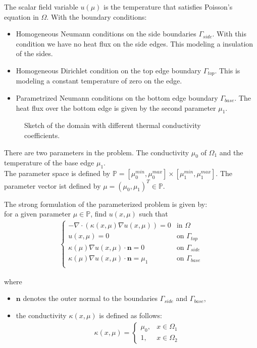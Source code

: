 The scalar field variable $u(\mu)$ is the temperature that satisfies Poisson’s equation in $\Omega$.
With the boundary conditions:
\begin{itemize}
	\item Homogeneous Neumann conditions on the side boundaries $\Gamma_{side}$. With this condition we have no heat  flux on the side edges.
	This modeling a insulation of the sides.
	\item Homogeneous Dirichlet condition on the top edge boundary $\Gamma_{top}$. This is modeling a constant temperature of zero on the edge.
	\item Parametrized Neumann conditions on the bottom edge boundary $\Gamma_{base}$. The heat flux over the bottom edge is given by the second parameter $\mu_1$.
\end{itemize}

\begin{figure}[H]
	\centering
	\scalebox{0.8}{
	
	}
	\caption[Sketch domain]{Sketch of the domain with different thermal conductivity coefficients.}
	\label{fig:scetchHeat}
\end{figure}

There are two parameters in the problem. The conductivity $\mu_0$ of $\Omega_1$ and the temperature of the base edge $\mu_1$.\\
The parameter space is defined by $\mathbb{P} = [\mu_{0}^{min},\mu_{0}^{max}] \times [\mu_{1}^{min},\mu_{1}^{max}]$. The parameter vector ist defined by $\mu = (\mu_0, \mu_1)^T \in \mathbb{P}$.

The strong formulation of the para\-meterized problem is given by:\\
for a given parameter $\mu \in \mathbb{P}$, find $u(x,\mu)$ such that
\begin{align}
\begin{cases}
- \nabla \cdot (\kappa(x,\mu)\nabla u(x,\mu)) = 0 	& \text{in } \Omega 		\\
u(x,\mu) = 0 										& \text{on } \Gamma_{top} 	\\
\kappa(\mu)\nabla u(x,\mu)\cdot \mathbf{n} = 0 		& \text{on } \Gamma_{side} 	\\
\kappa(\mu)\nabla u(x,\mu)\cdot \mathbf{n} = \mu_1 	& \text{on } \Gamma_{base} 	\\
\end{cases}
\end{align}


where 
\begin{itemize}
	\item $\mathbf{n}$ denotes the outer normal to the boundaries $\Gamma_{side}$ and $\Gamma_{base}$,
	\item the conductivity $\kappa(x,\mu)$ is defined as follows:
	\begin{align}
		\kappa(x,\mu) =
		\begin{cases}
		\mu_0, & x \in \Omega_1\\
		1, & x \in \Omega_2
		\end{cases}		
	\end{align}
\end{itemize}

